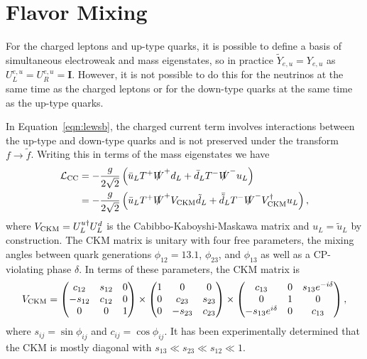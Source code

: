 \section{Flavor Mixing}

For the charged leptons and up-type quarks, it is possible to define a basis of simultaneous electroweak and mass eigenstates, so in practice $\tilde Y_{e,u} = Y_{e,u}$ as $U^{e,u}_L = U^{e,u}_R = \mathit{\mathbf{I}}$.
However, it is not possible to do this for the neutrinos at the same time as the charged leptons or for the down-type quarks at the same time as the up-type quarks.

In Equation~\ref{eqn:lewsb}, the charged current term involves interactions between the up-type and down-type quarks and is not preserved under the transform $f \rightarrow \tilde f$.
Writing this in terms of the mass eigenstates we have
\begin{align}
  \mathcal{L}_{\text{CC}} %
  & = - \frac{g}{2\sqrt{2}} \left( \bar u_L T^+ \slashed W^+ d_L + \bar d_L T^- \slashed W^- u_L \right) \nonumber \\
  & = - \frac{g}{2\sqrt{2}} \left( \bar{u}_L  T^+ \slashed W^+ \vckm \tilde{d}_L + \bar{\tilde{d}}_L T^- \slashed W^- \vckm^\dagger u_L \right),
\end{align}
where $V_{\text{CKM}} = U^{u\dagger}_L U^d_L$ is the Cabibbo-Kaboyshi-Maskawa matrix and $u_L = \tilde{u}_L$ by construction.
The CKM matrix is unitary with four free parameters, the mixing angles between quark generations $\phi_{12} = 13.1$, $\phi_{23}$, and $\phi_{13}$ as well as a CP-violating phase $\delta$.
In terms of these parameters, the CKM matrix is
\begin{equation}
  V_{\text{CKM}} = \begin{pmatrix} c_{12} & s_{12} & 0 \\ - s_{12} & c_{12} & 0 \\ 0 & 0 & 1 \end{pmatrix}
  \times \begin{pmatrix} 1 & 0 & 0  \\ 0 & c_{23} & s_{23} \\ 0 & - s_{23} & c_{23} \end{pmatrix}
  \times \begin{pmatrix} c_{13} & 0 & s_{13} e^{-i\delta} \\ 0 & 1 & 0 \\ -s_{13} e^{i\delta} & 0 & c_{13} \end{pmatrix},
\end{equation}
where $s_{ij} = \sin \phi_{ij}$ and $c_{ij} = \cos \phi_{ij}$.
It has been experimentally determined that the CKM is mostly diagonal with $s_{13} \ll s_{23} \ll s_{12} \ll 1$. 

